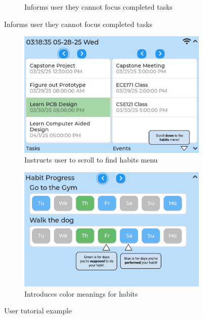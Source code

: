 \begin{figure}
\begin{subfigure}{0.5\textwidth}
        \caption{Informs user they cannot focus completed tasks}
    \end{subfigure}
    \end{figure}
\begin{figure}
	\ContinuedFloat
    \begin{subfigure}{0.5\textwidth}
        \includegraphics[width = \textwidth]{scroll_habits.png}
        \caption{Instructs user to scroll to find habits menu}
    \end{subfigure}
    \begin{subfigure}{0.5\textwidth}
        \includegraphics[width = \textwidth]{habit_tutorial.png}
        \caption{Introduces color meanings for habits}
    \end{subfigure}
\caption{User tutorial example}
\label{fig:user_tutorial}
\end{figure}
